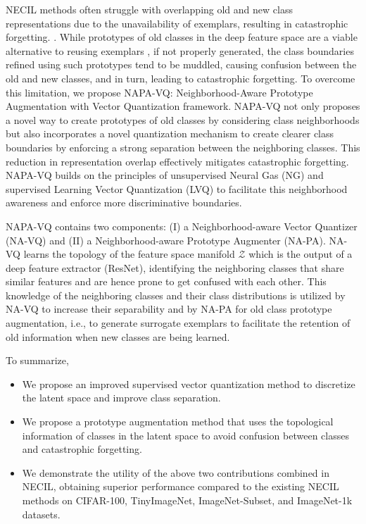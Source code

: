 \documentclass[10pt,twocolumn,letterpaper]{article}
\begin{document}
NECIL methods often struggle with overlapping old and new class representations due to the unavailability of exemplars, resulting in catastrophic forgetting. \cite{Zhu2021PrototypeLearning}.
While prototypes of old classes in the deep feature space are a viable alternative to reusing exemplars \cite{Zhu2021PrototypeLearning, Zhu2021Class-IncrementalAugmentation}, if not properly generated, the class boundaries refined using such prototypes tend to be muddled, causing confusion between the old and new classes, and in turn, leading to catastrophic forgetting. To overcome this limitation, we propose NAPA-VQ: Neighborhood-Aware Prototype Augmentation with Vector Quantization framework. NAPA-VQ not only proposes a novel way to create prototypes of old classes by considering class neighborhoods but also incorporates a novel quantization mechanism to create clearer class boundaries by enforcing a strong separation between the neighboring classes. This reduction in representation overlap effectively mitigates catastrophic forgetting. NAPA-VQ builds on the principles of unsupervised Neural Gas (NG) \cite{ThomasMartinetzandKlausSchulten1991ATopologies} and supervised Learning Vector Quantization (LVQ) \cite{Kohonen1990ImprovedQuantization} to facilitate this neighborhood awareness and enforce more discriminative boundaries. 

NAPA-VQ contains two  components: (I) a Neighborhood-aware Vector Quantizer (NA-VQ) and (II) a Neighborhood-aware Prototype Augmenter  (NA-PA).  NA-VQ learns the topology of the feature space manifold $\mathcal{Z}$ which is the output of a deep feature extractor (\eg ResNet), identifying the neighboring classes that share similar features and are hence prone to get confused with each other. This knowledge of the neighboring classes and their class distributions is utilized by NA-VQ to increase their separability and by NA-PA for old class prototype augmentation, i.e., to generate surrogate exemplars to facilitate the retention of old information when new classes are being learned.

To summarize,
\begin{itemize}
  \item We propose an improved supervised vector quantization method to discretize the latent space and improve class separation.
  \item We propose a prototype augmentation method that uses the topological information of classes in the latent space to avoid confusion between classes and catastrophic forgetting.
    \item We demonstrate the utility of the above two contributions combined in NECIL, obtaining superior performance compared to the existing NECIL methods on CIFAR-100, TinyImageNet, ImageNet-Subset, and ImageNet-1k datasets.
\end{itemize}
\end{document}
